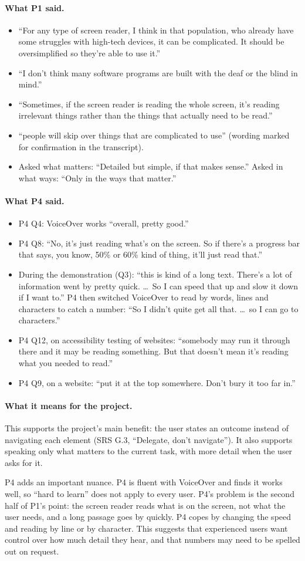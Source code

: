 \documentclass[12pt, titlepage]{article}
\newcommand{\said}{\paragraph{What P1 said.}}
\newcommand{\saidfour}{\paragraph{What P4 said.}}
\newcommand{\means}{\paragraph{What it means for the project.}}
\begin{document}
\said
\begin{itemize}
    \item ``For any type of screen reader, I think in that population, who already have some struggles with high-tech devices, it can be complicated. It should be oversimplified so they're able to use it.''
    \item ``I don't think many software programs are built with the deaf or the blind in mind.''
    \item ``Sometimes, if the screen reader is reading the whole screen, it's reading irrelevant things rather than the things that actually need to be read.''
    \item ``people will skip over things that are complicated to use'' (wording marked for confirmation in the transcript).
    \item Asked what matters: ``Detailed but simple, if that makes sense.'' Asked in what ways: ``Only in the ways that matter.''
\end{itemize}

\saidfour
\begin{itemize}
    \item P4 Q4: VoiceOver works ``overall, pretty good.''
    \item P4 Q8: ``No, it's just reading what's on the screen. So if there's a progress bar that says, you know, 50\% or 60\% kind of thing, it'll just read that.''
    \item During the demonstration (Q3): ``this is kind of a long text. There's a lot of information went by pretty quick. \ldots\ So I can speed that up and slow it down if I want to.'' P4 then switched VoiceOver to read by words, lines and characters to catch a number: ``So I didn't quite get all that. \ldots\ so I can go to characters.''
    \item P4 Q12, on accessibility testing of websites: ``somebody may run it through there and it may be reading something. But that doesn't mean it's reading what you needed to read.''
    \item P4 Q9, on a website: ``put it at the top somewhere. Don't bury it too far in.''
\end{itemize}

\means
This supports the project's main benefit: the user states an outcome instead of navigating each element (SRS G.3, ``Delegate, don't navigate''). It also supports speaking only what matters to the current task, with more detail when the user asks for it.

P4 adds an important nuance. P4 is fluent with VoiceOver and finds it works well, so ``hard to learn'' does not apply to every user. P4's problem is the second half of P1's point: the screen reader reads what is on the screen, not what the user needs, and a long passage goes by quickly. P4 copes by changing the speed and reading by line or by character. This suggests that experienced users want control over how much detail they hear, and that numbers may need to be spelled out on request.
\end{document}
